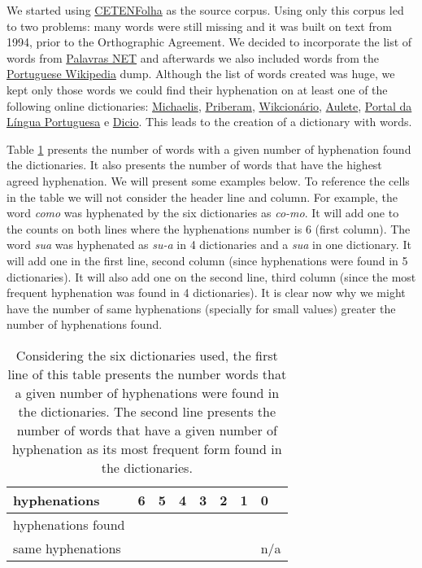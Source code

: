 \documentclass{article}
\begin{document}
We started using
\href{https://www.linguateca.pt/cetenfolha/index_info.html}{CETENFolha} as the
source corpus. Using only this corpus led to two problems: many words were
still missing and it was built on text from 1994, prior to the Orthographic
Agreement. We decided to incorporate the list of words from
\href{https://www.palavras.net/}{Palavras NET} and afterwards we also included
words from the \href{https://pt.wikipedia.org}{Portuguese Wikipedia} dump.
Although the list of words created was huge, we kept only those words we could
find their hyphenation on at least one of the following online dictionaries: 
\href{https://michaelis.uol.com.br/}{Michaelis},
\href{https://dicionario.priberam.org/}{Priberam},
\href{https://pt.wiktionary.org}{Wikcionário},
\href{https://aulete.com.br/}{Aulete},
\href{http://www.portaldalinguaportuguesa.org/}{Portal da Língua Portuguesa} e
\href{https://www.dicio.com.br/}{Dicio}.
This leads to the creation of a dictionary with \DictionarySize{} words.

Table \ref{tblstats} presents the number of words with a given number of
hyphenation found the dictionaries. It also presents the number of words that
have the highest agreed hyphenation. We will present some examples below. To
reference the cells in the table we will not consider the header line and
column. For example, the word \emph{como} was hyphenated by the six
dictionaries as \emph{co-mo}. It will add one to the counts on both lines
where the hyphenations number is 6 (first column). The word \emph{sua} was
hyphenated as \emph{su-a} in 4 dictionaries and a \emph{sua} in one
dictionary. It will add one in the first line, second column (since hyphenations
were found in 5 dictionaries). It will also add one on the second line, third
column (since the most frequent hyphenation was found in 4 dictionaries). It is
clear now why we might have the number of same hyphenations (specially for
small values) greater the number of hyphenations found. 


\begin{table}
\centering
\caption{Considering the six dictionaries used, the first line of this table
presents the number words that a given number of hyphenations were found in the
dictionaries. The second line presents the number of words that have a given
number of hyphenation as its most frequent form found in the
dictionaries.}\label{tblstats}
\small
\begin{tabular}{*{8}{l}}
    hyphenations & 6 & 5 & 4 & 3 & 2 & 1 & 0 \\
    \hline
    hyphenations found & \NumberOfSixHyphens{} & \NumberOfFiveHyphens{} &
    \NumberOfFourHyphen{} & \NumberOfThreeHyphens{} & \NumberOfTwoHyphens{} &
    \NumberOfOneHyphens{} & \NumberOfNoHyphens{} \\

    same hyphenations & \NumberOfSixAgrees{} & \NumberOfFiveAgrees{} &
    \NumberOfFourAgrees{} & \NumberOfThreeAgrees{} & \NumberOfTwoAgrees{} &
    \NumberOfOneAgrees{} & n/a
\end{tabular}
\end{table}
\end{document}
